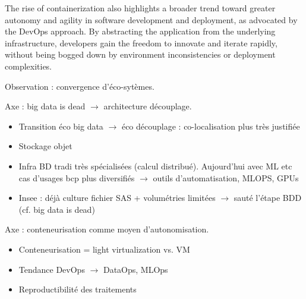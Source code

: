 The rise of containerization also highlights a broader trend toward greater autonomy and agility in software development and deployment, as advocated by the DevOps approach. By abstracting the application from the underlying infrastructure, developers gain the freedom to innovate and iterate rapidly, without being bogged down by environment inconsistencies or deployment complexities. 






Observation : convergence d'éco-sytèmes.

Axe : big data is dead $\rightarrow$ architecture découplage.
\begin{itemize}
    \item Transition éco big data $\rightarrow$ éco découplage : co-localisation plus très justifiée
    \item Stockage objet
    \item Infra BD tradi très spécialisées (calcul distribué). Aujourd'hui avec ML etc cas d'usages bcp plus diversifiés $\rightarrow$ outils d'automatisation, MLOPS, GPUs
    \item Insee : déjà culture fichier SAS + volumétries limitées $\rightarrow$ sauté l'étape BDD (cf. big data is dead)
\end{itemize}

Axe : conteneurisation comme moyen d'autonomisation.
\begin{itemize}
    \item Conteneurisation = light virtualization vs. VM
    \item Tendance DevOps $\rightarrow$ DataOps, MLOps
    \item Reproductibilité des traitements
\end{itemize}